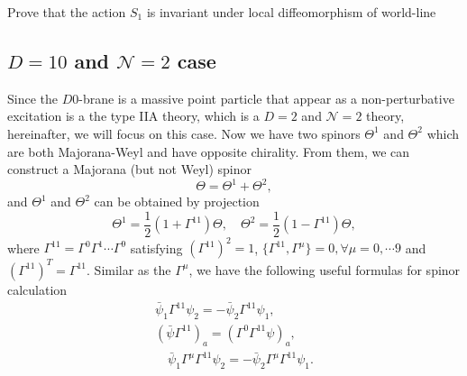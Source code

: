 \documentclass[graybox,envcountchap,sectrefs]{svmono}
\begin{document}
\begin{exercise}
Prove that the action $S_1$ is invariant under local diffeomorphism of world-line
\end{exercise}



\subsection{$D=10$ and $\mathcal{N}=2$ case}

Since the $D0$-brane is a massive point particle that appear as a non-perturbative excitation is a the type IIA theory, which is a $D=2$ and $\mathcal{N}=2$ theory, hereinafter, we will focus on this case.
Now we have two spinors $\Theta^1$ and $\Theta^2$ which are both Majorana-Weyl and have opposite chirality. From them, we can construct a Majorana (but not Weyl) spinor 
\begin{equation}
\Theta=\Theta^1+\Theta^2,
\end{equation}
and $\Theta^1$ and $\Theta^2$ can be obtained by projection
\begin{equation}
\Theta^1=\frac{1}{2}(1+\Gamma^{11})\Theta,\quad \Theta^2=\frac{1}{2}(1-\Gamma^{11})\Theta,	
\end{equation}
where $\Gamma^{11}=\Gamma^0\Gamma^1\cdots \Gamma^9$ satisfying $(\Gamma^{11})^2=1$, $\{\Gamma^{11},\Gamma^{\mu}\}=0,\forall \mu=0,\cdots 9$ and $(\Gamma^{11})^T=\Gamma^{11}$.
Similar as the $\Gamma^{\mu}$, we have the following useful formulas for spinor calculation
\begin{align}
\bar{\psi}_1\Gamma^{11}\psi_2=-\bar{\psi}_2\Gamma^{11}\psi_1,\\
	(\bar{\psi}\Gamma^{11})_a=(\Gamma^0\Gamma^{11}\psi)_a,\\
	\quad \bar{\psi}_1\Gamma^{\mu}\Gamma^{11}\psi_2=-\bar{\psi}_2\Gamma^{\mu}\Gamma^{11}\psi_1.
\end{align}
\end{document}
